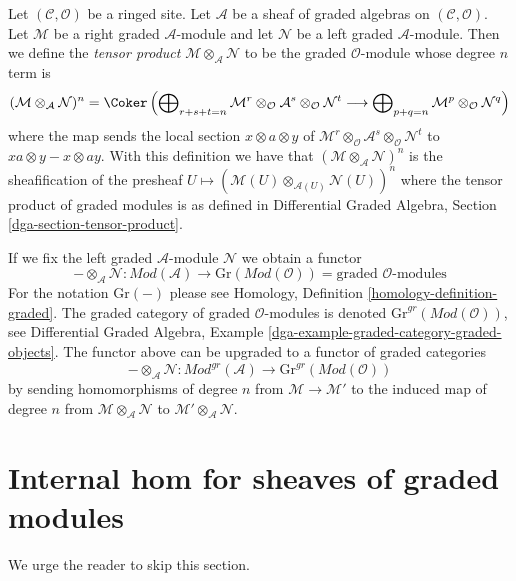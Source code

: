 \medskip\noindent
Let $(\mathcal{C}, \mathcal{O})$ be a ringed site. Let $\mathcal{A}$
be a sheaf of graded algebras on $(\mathcal{C}, \mathcal{O})$.
Let $\mathcal{M}$ be a right graded $\mathcal{A}$-module
and let $\mathcal{N}$ be a left graded $\mathcal{A}$-module.
Then we define the {\it tensor product}
$\mathcal{M} \otimes_\mathcal{A} \mathcal{N}$
to be the graded $\mathcal{O}$-module whose degree $n$ term is
$$
(\mathcal{M} \otimes_\mathcal{A} \mathcal{N})^n =
\Coker\left(
\bigoplus\nolimits_{r + s + t = n} \mathcal{M}^r \otimes_\mathcal{O}
\mathcal{A}^s \otimes_\mathcal{O} \mathcal{N}^t
\longrightarrow
\bigoplus\nolimits_{p + q = n} \mathcal{M}^p \otimes_\mathcal{O} \mathcal{N}^q
\right)
$$
where the map sends the local section $x \otimes a \otimes y$
of $\mathcal{M}^r \otimes_\mathcal{O} \mathcal{A}^s
\otimes_\mathcal{O} \mathcal{N}^t$ to
$xa \otimes y - x \otimes ay$.
With this definition we have that
$(\mathcal{M} \otimes_\mathcal{A} \mathcal{N})^n$
is the sheafification of the presheaf
$U \mapsto (\mathcal{M}(U) \otimes_{\mathcal{A}(U)} \mathcal{N}(U))^n$
where the tensor product of graded modules is as defined in
Differential Graded Algebra, Section \ref{dga-section-tensor-product}.

\medskip\noindent
If we fix the left graded $\mathcal{A}$-module $\mathcal{N}$
we obtain a functor
$$
- \otimes_\mathcal{A} \mathcal{N} :
\textit{Mod}(\mathcal{A})
\longrightarrow
\text{Gr}(\textit{Mod}(\mathcal{O})) =
\text{graded }\mathcal{O}\text{-modules}
$$
For the notation $\text{Gr}(-)$ please see
Homology, Definition \ref{homology-definition-graded}.
The graded category of graded $\mathcal{O}$-modules is denoted
$\text{Gr}^{gr}(\textit{Mod}(\mathcal{O}))$, see
Differential Graded Algebra, Example
\ref{dga-example-graded-category-graded-objects}.
The functor above can be upgraded to a functor of graded categories
$$
- \otimes_\mathcal{A} \mathcal{N} :
\textit{Mod}^{gr}(\mathcal{A})
\longrightarrow
\text{Gr}^{gr}(\textit{Mod}(\mathcal{O}))
$$
by sending homomorphisms of degree $n$ from $\mathcal{M} \to \mathcal{M}'$
to the induced map of degree $n$ from
$\mathcal{M} \otimes_\mathcal{A} \mathcal{N}$ to
$\mathcal{M}' \otimes_\mathcal{A} \mathcal{N}$.

\section{Internal hom for sheaves of graded modules}
\label{sdga-section-internal-hom-graded}
We urge the reader to skip this section.

